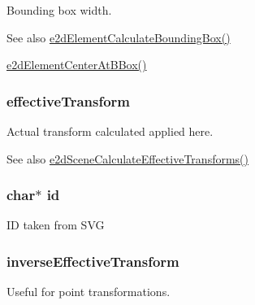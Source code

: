 Bounding box width. \begin{DoxySeeAlso}{See also}
\hyperlink{group__e2dElement_ga94aa710b2da71af2091fe4d5b87ce47e}{e2d\-Element\-Calculate\-Bounding\-Box()} 

\hyperlink{group__e2dElement_ga36b01a888c97163c990e16d348aff61c}{e2d\-Element\-Center\-At\-B\-Box()} 
\end{DoxySeeAlso}
\hypertarget{structe2dElement_a6c8e26945f09b5157e2111e42f99b879}{
\subsubsection[{effective\-Transform}]{ {\bf effective\-Transform}}}\label{structe2dElement_a6c8e26945f09b5157e2111e42f99b879}
Actual transform calculated applied here. \begin{DoxySeeAlso}{See also}
\hyperlink{group__e2dScene_gac4b32991ff8bab5d5ae429fb97b4e26c}{e2d\-Scene\-Calculate\-Effective\-Transforms()} 
\end{DoxySeeAlso}
\hypertarget{structe2dElement_aecb3b0d045ada529257a2fbf8f829599}{
\subsubsection[{id}]{\setlength{\rightskip}{0pt plus 5cm}char$\ast$ {\bf id}}}\label{structe2dElement_aecb3b0d045ada529257a2fbf8f829599}
I\-D taken from S\-V\-G \hypertarget{structe2dElement_a5e6d7341f2dbef1923b0a3fcc13781c6}{
\subsubsection[{inverse\-Effective\-Transform}]{ {\bf inverse\-Effective\-Transform}}}\label{structe2dElement_a5e6d7341f2dbef1923b0a3fcc13781c6}
Useful for point transformations.

